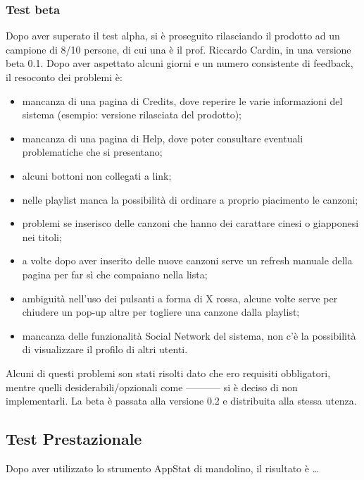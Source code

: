 \subsubsection{Test beta}
Dopo aver superato il test alpha, si \`e proseguito rilasciando il prodotto ad
un campione di 8/10 persone, di cui una \`e il prof. Riccardo Cardin, in una
versione beta 0.1. Dopo aver aspettato alcuni giorni e un numero consistente di
feedback, il resoconto dei problemi \`e:
\begin{itemize}
  \item mancanza di una pagina di Credits, dove reperire le varie informazioni
  del sistema (esempio: versione rilasciata del prodotto); 
  \item mancanza di una pagina di Help, dove poter consultare eventuali
  problematiche che si presentano;
  \item alcuni bottoni non collegati a link;
  \item nelle playlist manca la possibilit\`a di ordinare a proprio piacimento
  le canzoni;
  \item problemi se inserisco delle canzoni che hanno dei carattare cinesi o
  giapponesi nei titoli;
  \item a volte dopo aver inserito delle nuove canzoni serve un refresh manuale
  della pagina per far s\`i che compaiano nella lista;
  \item ambiguit\`a nell'uso dei pulsanti a forma di X rossa, alcune volte serve
  per chiudere un pop-up altre per togliere una canzone dalla playlist;
  \item mancanza delle funzionalit\`a Social Network del sistema, non c'\`e la
  possibilit\`a di visualizzare il profilo di altri utenti.
\end{itemize}
Alcuni di questi problemi son stati risolti dato che ero requisiti obbligatori,
mentre quelli desiderabili/opzionali come ----------- si \`e deciso di non
implementarli.
La beta \`e passata alla versione 0.2 e distribuita alla stessa utenza.

\subsection{Test Prestazionale}
Dopo aver utilizzato lo strumento AppStat di mandolino, il risultato \`e \ldots



\listoftables
{}
\listoffigures
{}



